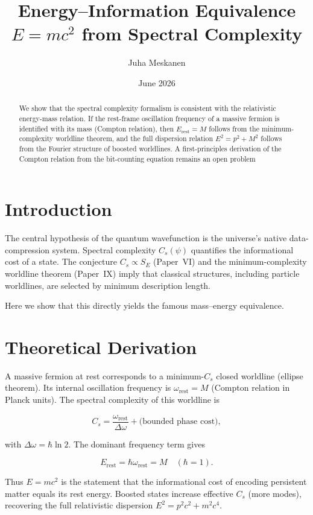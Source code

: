 \documentclass[11pt]{article}
\title{Energy--Information Equivalence $E=mc^2$ from Spectral Complexity}
\author{Juha Meskanen}
\date{June 2026}
\begin{document}
\maketitle

\begin{abstract}
  We show that the spectral complexity formalism is consistent with the relativistic energy-mass relation.
  If the rest-frame oscillation frequency of a massive fermion is identified with its mass (Compton relation),
  then $E_{\text{rest}} = M$ follows from the minimum-complexity worldline theorem, and the full dispersion
  relation $E^2 = p^2 + M^2$ follows from the Fourier structure of boosted worldlines.
  A first-principles derivation of the Compton relation from the bit-counting equation remains an open problem
\end{abstract}

\section{Introduction}
The central hypothesis of the quantum wavefunction is the universe's native data-compression system.
Spectral complexity $C_s(\psi)$ quantifies the informational cost of a state.
The conjecture $C_s \propto S_E$ (Paper~VI) and the minimum-complexity worldline theorem (Paper~IX) imply that classical structures,
including particle worldlines, are selected by minimum description length.

Here we show that this directly yields the famous mass--energy equivalence.

\section{Theoretical Derivation}

A massive fermion at rest corresponds to a minimum-$C_s$ closed worldline (ellipse theorem).
Its internal oscillation frequency is $\omega_{\mathrm{rest}} = M$ (Compton relation in Planck units).
The spectral complexity of this worldline is

\[
C_s = \frac{\omega_\text{rest}}{\Delta \omega} + \text{(bounded phase cost)},
\]

with $\Delta \omega = \hbar \ln 2$. The dominant frequency term gives

\[
E_\text{rest} = \hbar \omega_\text{rest} = M \quad (\hbar = 1).
\]

Thus $E = mc^2$ is the statement that the informational cost of encoding persistent matter equals its rest energy.
Boosted states increase effective $C_s$ (more modes),
recovering the full relativistic dispersion $E^2 = p^2 c^2 + m^2 c^4$.
\end{document}
